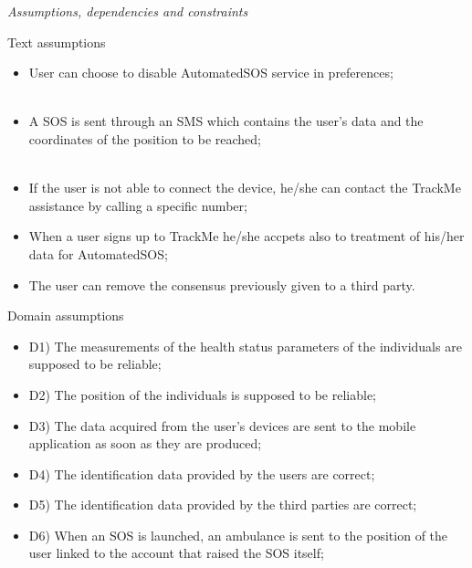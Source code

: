 \documentclass{article}
\begin{document}
\begin{legal}
\begin{legal}
{			}
		\item \textit{Assumptions, dependencies and constraints}\\
			\begin{legal}
    			\item Text assumptions\\
    			{\normalfont
				\begin{itemize}
					\item User can choose to disable AutomatedSOS service in preferences;\\\
					\item A SOS is sent through an SMS which contains the user's data and the coordinates of the position to be reached;\\\
					\item If the user is not able to connect the device, he/she can contact the TrackMe assistance by calling a specific number;\\
					\item When a user signs up to TrackMe he/she accpets also to treatment of his/her data for AutomatedSOS;\\
					\item The user can remove the consensus previously given to a third party.\\
				\end{itemize}}
			\item Domain assumptions \\
			{\normalfont
				\begin{itemize}
				\item D1) The measurements of the health status parameters of the individuals are supposed to be reliable;\\
				\item D2) The position of the individuals is supposed to be reliable;\\
				\item D3) The data acquired from the user’s devices are sent to the mobile application as soon as they are produced;\\
				\item D4) The identification data provided by the users are correct;\\
				\item D5) The identification data provided by the third parties are correct;\\
				\item D6) When an SOS is launched, an ambulance is sent to the position of the user linked to the account that raised the SOS itself;\\

\end{itemize}}
\end{legal}
\end{legal}
\end{legal}
\end{document}
